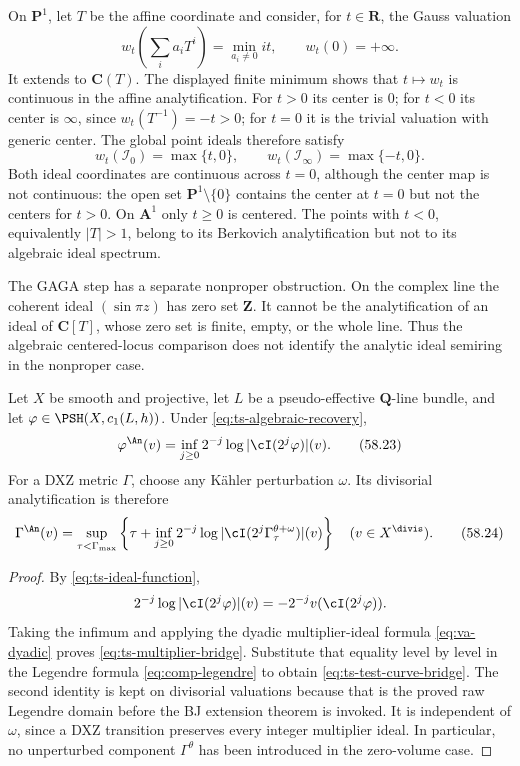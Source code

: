 \begin{example}\label{ex:ts-proper-center-charts}
On $\mathbf P^1$, let $T$ be the affine coordinate and consider,
for $t\in\mathbf R$, the Gauss valuation
\[
 w_t\left(\sum_i a_iT^i\right)
       =\min_{a_i\ne0} it,
 \qquad w_t(0)=+\infty.
\]
It extends to $\mathbf C(T)$. The displayed finite minimum shows
that $t\mapsto w_t$ is continuous in the affine analytification.
For $t>0$ its center is $0$;
for $t<0$ its center is $\infty$, since $w_t(T^{-1})=-t>0$;
for $t=0$ it is the trivial valuation with generic center.
The global point ideals therefore satisfy
\[
       w_t(\mathcal I_0)=\max\{t,0\},
       \qquad
       w_t(\mathcal I_\infty)=\max\{-t,0\}.
\]
Both ideal coordinates are continuous across $t=0$, although the
center map is not continuous: the open set
$\mathbf P^1\setminus\{0\}$ contains the center at $t=0$ but
not the centers for $t>0$. On $\mathbf A^1$ only $t\geq0$ is
centered. The points with $t<0$, equivalently $|T|>1$, belong to
its Berkovich analytification but not to its algebraic ideal spectrum.

The GAGA step has a separate nonproper obstruction. On the complex
line the coherent ideal $(\sin\pi z)$ has zero set $\mathbf Z$.
It cannot be the analytification of an ideal of $\mathbf C[T]$,
whose zero set is finite, empty, or the whole line. Thus the
algebraic centered-locus comparison does not identify the analytic
ideal semiring in the nonproper case.
\end{example}

\begin{proposition}
\label{prop:ts-multiplier-bridge}
Let $X$ be smooth and projective, let $L$ be a pseudo-effective
$\mathbf Q$-line bundle, and let
$\varphi\in\PSH(X,c_1(L,h))$.  Under
\eqref{eq:ts-algebraic-recovery},
\[
 \varphi^{\An}(v)
 =\inf_{j\geq0}2^{-j}
       \log|\cI(2^j\varphi)|(v).
\tag{58.23}\label{eq:ts-multiplier-bridge}
\]
For a DXZ metric $\Gamma$, choose any K\"ahler perturbation $\omega$.
Its divisorial analytification is therefore
\[
 \Gamma^{\An}(v)
 =\sup_{\tau<\Gamma_{\max}}
   \left\{\tau+\inf_{j\geq0}2^{-j}
     \log|\cI(2^j\Gamma^{\theta+\omega}_\tau)|(v)\right\}
 \quad(v\in X^{\divis}).
\tag{58.24}\label{eq:ts-test-curve-bridge}
\]
\end{proposition}

\begin{proof}
By \eqref{eq:ts-ideal-function},
\[
 2^{-j}\log|\cI(2^j\varphi)|(v)
 =-2^{-j}v(\cI(2^j\varphi)).
\]
Taking the infimum and applying the dyadic multiplier-ideal formula
\eqref{eq:va-dyadic} proves
\eqref{eq:ts-multiplier-bridge}.  Substitute that equality level by level
in the Legendre formula \eqref{eq:comp-legendre} to obtain
\eqref{eq:ts-test-curve-bridge}.  The second identity is kept on divisorial
valuations because that is the proved raw Legendre domain before the BJ
extension theorem is invoked.  It is independent of $\omega$, since a
DXZ transition preserves every integer multiplier ideal.  In particular,
no unperturbed component $\Gamma^\theta$ has been introduced in the
zero-volume case.
\end{proof}

